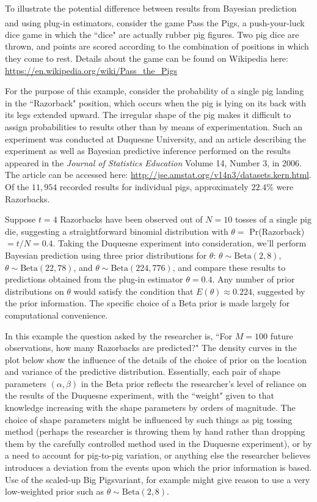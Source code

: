 \documentclass[12pt, a4paper]{article}
\begin{document}
  To illustrate the potential difference between results from Bayesian prediction and using plug-in estimators, consider the game Pass the Pigs\textsuperscript{\circledR}, a push-your-luck dice game in which the ``dice" are actually rubber pig figures.  Two pig dice are thrown, and points are scored according to the combination of positions in which they come to rest.  Details about the game can be found on Wikipedia here: \url{https://en.wikipedia.org/wiki/Pass_the_Pigs}

  For the purpose of this example, consider the probability of a single pig landing in the ``Razorback" position, which occurs when the pig is lying on its back with its legs extended upward.  The irregular shape of the pig makes it difficult to assign probabilities to results other than by means of experimentation.  Such an experiment was conducted at Duquesne University, and an article describing the experiment as well as Bayesian predictive inference performed on the results appeared in the \textit{Journal of Statistics Education} Volume 14, Number 3, in 2006.  The article can be accessed here:  \url{http://jse.amstat.org/v14n3/datasets.kern.html}. Of the $11,954$ recorded results for individual pigs, approximately $22.4\%$ were Razorbacks.

  Suppose $t=4$ Razorbacks have been observed out of $N=10$ tosses of a single pig die, suggesting a straightforward binomial distribution with $\theta =$ Pr(Razorback) $= t/N = 0.4$. Taking the Duquesne experiment into consideration, we'll perform Bayesian prediction using three prior distributions for $\theta$: $\theta\sim\text{Beta}(2,8)$, $\theta\sim\text{Beta}(22,78)$, and $\theta\sim\text{Beta}(224,776)$, and compare these results to predictions obtained from the plug-in estimator $\theta = 0.4$.   Any number of prior distributions on $\theta$ would satisfy the condition that $E(\theta) \approx 0.224$, suggested by the prior information.  The specific choice of a Beta prior is made largely for computational convenience.

  In this example the question asked by the researcher is, ``For $M = 100$ future observations, how many Razorbacks are predicted?"  The density curves in the plot below show the influence of the details of the choice of prior on the location and variance of the predictive distribution.  Essentially, each pair of shape parameters $(\alpha,\beta)$ in the Beta prior reflects the researcher's level of reliance on the results of the Duquesne experiment, with the ``weight" given to that knowledge increasing with the shape parameters by orders of magnitude.  The choice of shape parameters might be influenced by such things as pig tossing method (perhaps the researcher is throwing them by hand rather than dropping them by the carefully controlled method used in the Duquesne experiment), or by a need to account for pig-to-pig variation, or anything else the researcher believes introduces a deviation from the events upon which the prior information is based.  Use of the scaled-up Big Pigs\texttrademark variant, for example might give reason to use a very low-weighted prior such as $\theta\sim\text{Beta}(2,8)$.
\end{document}
